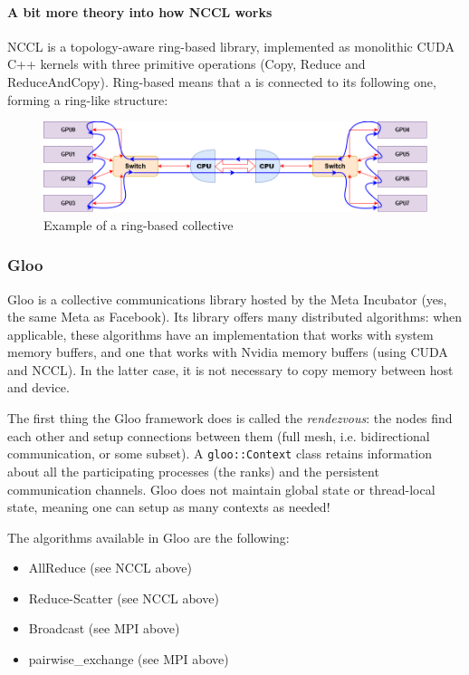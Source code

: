 \documentclass{article}
\begin{document}
\paragraph{A bit more theory into how NCCL works}
NCCL is a topology-aware ring-based library, implemented as monolithic CUDA C++ kernels with three primitive operations (Copy, Reduce and ReduceAndCopy). Ring-based means that a  is connected to its following one, forming a ring-like structure:

\begin{figure}[h!]
  \center
  \includegraphics[width=0.75\linewidth]{images/2022-09-07-15-37-09.png}
  \caption{Example of a ring-based collective}
\end{figure}
\FloatBarrier

\subsubsection{Gloo}
Gloo is a collective communications library hosted by the Meta Incubator (yes, the same Meta as Facebook). Its library offers many distributed algorithms: when applicable, these algorithms have an implementation that works with system memory buffers, and one that works with Nvidia  memory buffers (using CUDA and NCCL). In the latter case, it is not necessary to copy memory between host and device.

The first thing the Gloo framework does is called the \emph{rendezvous}: the nodes find each other and setup connections between them (full mesh, i.e. bidirectional communication, or some subset). A \lstinline{gloo::Context} class retains information about all the participating processes (the ranks) and the persistent communication channels. Gloo does not maintain global state or thread-local state, meaning one can setup as many contexts as needed!

The algorithms available in Gloo are the following:
\begin{itemize}[noitemsep]
  \item AllReduce (see NCCL above)
  \item Reduce-Scatter (see NCCL above)
  \item Broadcast (see MPI above)
  \item pairwise\_exchange (see MPI above)
\end{itemize}
\end{document}

